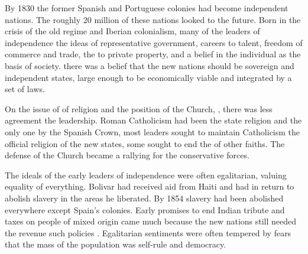 
\qquad By 1830 the former Spanish and Portuguese colonies had become independent nations. The roughly 20 million   \underline{\quad}   of these nations looked   \underline{\quad}   to the future. Born in the crisis of the old regime and Iberian colonialism, many of the leaders of independence   \underline{\quad}   the ideas of representative government, careers   \underline{\quad}   to talent, freedom of commerce and trade, the   \underline{\quad}   to private property, and a belief in the individual as the basis of society. \underline{\quad}  there was a belief that the new nations should be sovereign and independent states, large enough to be economically viable and integrated by a   \underline{\quad}  set of laws.

\qquad On the issue of   \underline{\quad}   of religion and the position of the Church,  \underline{\quad}  , there was less agreement   \underline{\quad}   the leadership. Roman Catholicism had been the state religion and the only one   \underline{\quad}  by the Spanish Crown,  \underline{\quad}  most leaders sought to maintain Catholicism   \underline{\quad}   the official religion of the new states, some sought to end the   \underline{\quad}  of other faiths. The defense of the Church became a rallying   \underline{\quad}   for the conservative forces.

\qquad The ideals of the early leaders of independence were often egalitarian, valuing equality of everything. Bolivar had received aid from Haiti and had  \underline{\quad}  in return to abolish slavery in the areas he liberated. By 1854 slavery had been abolished everywhere except Spain's   \underline{\quad}   colonies. Early promises to end Indian tribute and taxes on people of mixed origin came much   \underline{\quad}   because the new nations still needed the revenue such policies   \underline{\quad}.   Egalitarian sentiments were often tempered by fears that the mass of the population was   \underline{\quad}   self-rule and democracy.

\vspace{6pt}

